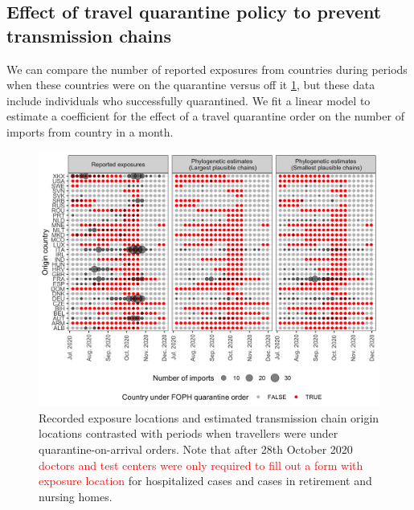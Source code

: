\documentclass[9pt,twocolumn,twoside,lineno]{pnas-new}
\begin{document}


% 

\subsection{Effect of travel quarantine policy to prevent transmission chains}

We can compare the number of reported exposures from countries during periods when these countries were on the quarantine versus off it \ref{fig:chain-origins-by-quarantine-status}, but these data include individuals who successfully quarantined. 
We fit a linear model to estimate a coefficient for the effect of a travel quarantine order on the number of imports from country in a month.

\begin{figure}[tbhp]
\centering
\includegraphics[width = 0.8\linewidth]{figures/chain_origins_by_quarantine_status.png}
\caption{Recorded exposure locations and estimated transmission chain origin locations contrasted with periods when travellers were under quarantine-on-arrival orders. Note that after 28th October 2020 \textcolor{red}{doctors and test centers were only required to fill out a form with exposure location} for hospitalized cases and cases in retirement and nursing homes.}  
\label{fig:chain-origins-by-quarantine-status}
\end{figure}
\end{document}
